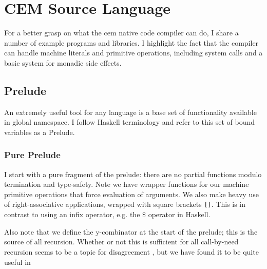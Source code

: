 \chapter{CEM Source Language}
For a better grasp on what the cem native code compiler can do, I share a
number of example programs and libraries. I highlight the fact that the compiler
can handle machine literals and primitive operations, including system calls and
a basic system for monadic side effects.  

\section{Prelude}
An extremely useful tool for any language is a base set of functionality
available in global namespace. I follow Haskell terminology and refer to this
set of bound variables as a Prelude. 

\subsection{Pure Prelude}
I start with a pure fragment of the prelude: there are no partial functions
modulo termination and type-safety. Note we have wrapper functions for our
machine primitive operations that force evaluation of arguments. We also make
heavy use of right-associative applications, wrapped with square brackets
\texttt{[]}. This is in contrast to using an infix operator, e.g. the $\$$
operator in Haskell.

Also note that we define the y-combinator at the start of the prelude; this is
the source of all recursion. Whether or not this is sufficient for all
call-by-need recursion seems to be a topic for disagreement \cite{ariola}, but
we have found it to be quite useful in     

